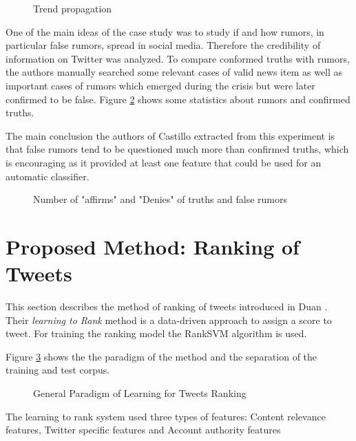 \documentclass{proseminar}
\let\i\undefined
\newcommand{\i}[1]{\emph{#1}}
\begin{document}
\begin{figure}[h]
\centering
{}
\caption{Trend propagation}
\label{fig:p1propgation}
\end{figure}


One of the main ideas of the case study was to study if and how rumors, in particular false rumors, spread in social media. Therefore the credibility of information on Twitter was analyzed. To compare conformed truths with rumors, the authors manually searched some relevant cases of valid news item as well as important cases of rumors which emerged during the crisis but were later confirmed to be false.
Figure \ref{fig:p1rumors} shows some statistics about rumors and confirmed truths.

The main conclusion the authors of Castillo \i{et al.} extracted from this experiment is that false rumors tend to be
questioned much more than confirmed truths, which is encouraging as it provided at least one feature that could be used for an automatic classifier. 

\begin{figure}[h]
\centering
{}
\caption{Number of "affirms" and "Denies" of truths and false rumors}
\label{fig:p1rumors}
\end{figure}




\section{Proposed Method: Ranking of \\Tweets}
This section describes the method of ranking of tweets introduced in Duan \i{et al.}. 
Their \textit{learning to Rank} method is a data-driven approach to assign a score to tweet. 
For training the ranking model the RankSVM\cite{ranksvm} algorithm is used.

Figure \ref{fig:p2overview} shows the the paradigm of the method and the separation of the training and test corpus.

\begin{figure}[h]
\centering
{}
\caption{General Paradigm of Learning for Tweets Ranking}
\label{fig:p2overview}
\end{figure}

The learning to rank system used three types of features: Content relevance features, Twitter specific features and Account authority features
\end{document}
